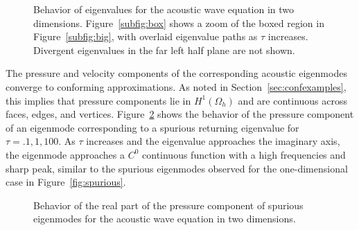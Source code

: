 \documentclass[10pt]{article}
\newcommand{\Oh}{\Omega_h}
\begin{document}
\begin{figure}
\caption{Behavior of eigenvalues for the acoustic wave equation in two dimensions.  Figure~\ref{subfig:box} shows a zoom of the boxed region in Figure~\ref{subfig:big}, with overlaid eigenvalue paths as $\tau$ increases.  Divergent eigenvalues in the far left half plane are not shown.  }
\label{fig:trackEigsWave}
\end{figure}

The pressure and velocity components of the corresponding acoustic eigenmodes converge to conforming approximations.  As noted in Section~\ref{sec:confexamples}, this implies that pressure components lie in $H^1(\Oh)$ and are continuous across faces, edges, and vertices.  Figure~\ref{fig:trackModesWave} shows the behavior of the pressure component of an eigenmode corresponding to a spurious returning eigenvalue for $\tau = .1, 1, 100$.  As $\tau$ increases and the eigenvalue approaches the imaginary axis, the eigenmode approaches a $C^0$ continuous function with a high frequencies and sharp peak, similar to the spurious eigenmodes observed for the one-dimensional case in Figure~\ref{fig:spurious}.

\begin{figure}
\centering
{}
\hspace{.5em}
\hspace{.5em}
\caption{Behavior of the real part of the pressure component of spurious eigenmodes for the acoustic wave equation in two dimensions.  }
\label{fig:trackModesWave}
\end{figure}
\end{document}
